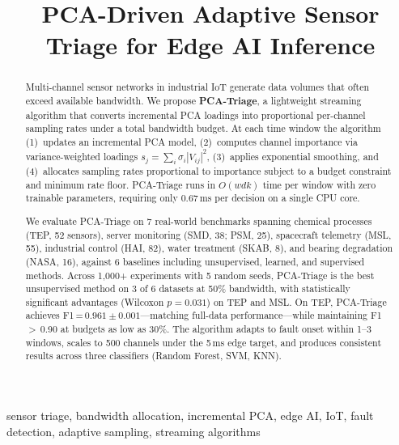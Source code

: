 \documentclass[journal]{IEEEtran}
\begin{document}
\title{PCA-Driven Adaptive Sensor Triage for Edge AI Inference}

\author{
}

\maketitle

\begin{abstract}
Multi-channel sensor networks in industrial IoT generate data volumes that often exceed available bandwidth. We propose \textbf{PCA-Triage}, a lightweight streaming algorithm that converts incremental PCA loadings into proportional per-channel sampling rates under a total bandwidth budget. At each time window the algorithm (1)~updates an incremental PCA model, (2)~computes channel importance via variance-weighted loadings $s_j = \sum_i \sigma_i |V_{ij}|^2$, (3)~applies exponential smoothing, and (4)~allocates sampling rates proportional to importance subject to a budget constraint and minimum rate floor. PCA-Triage runs in $O(wdk)$ time per window with zero trainable parameters, requiring only 0.67\,ms per decision on a single CPU core.

We evaluate PCA-Triage on 7 real-world benchmarks spanning chemical processes (TEP, 52 sensors), server monitoring (SMD, 38; PSM, 25), spacecraft telemetry (MSL, 55), industrial control (HAI, 82), water treatment (SKAB, 8), and bearing degradation (NASA, 16), against 6 baselines including unsupervised, learned, and supervised methods. Across 1,000+ experiments with 5 random seeds, PCA-Triage is the best unsupervised method on 3 of 6 datasets at 50\% bandwidth, with statistically significant advantages (Wilcoxon $p = 0.031$) on TEP and MSL. On TEP, PCA-Triage achieves F1\,=\,$0.961 \pm 0.001$---matching full-data performance---while maintaining F1\,$>$\,0.90 at budgets as low as 30\%. The algorithm adapts to fault onset within 1--3 windows, scales to 500 channels under the 5\,ms edge target, and produces consistent results across three classifiers (Random Forest, SVM, KNN).
\end{abstract}

\begin{IEEEkeywords}
sensor triage, bandwidth allocation, incremental PCA, edge AI, IoT, fault detection, adaptive sampling, streaming algorithms
\end{IEEEkeywords}
\end{document}
